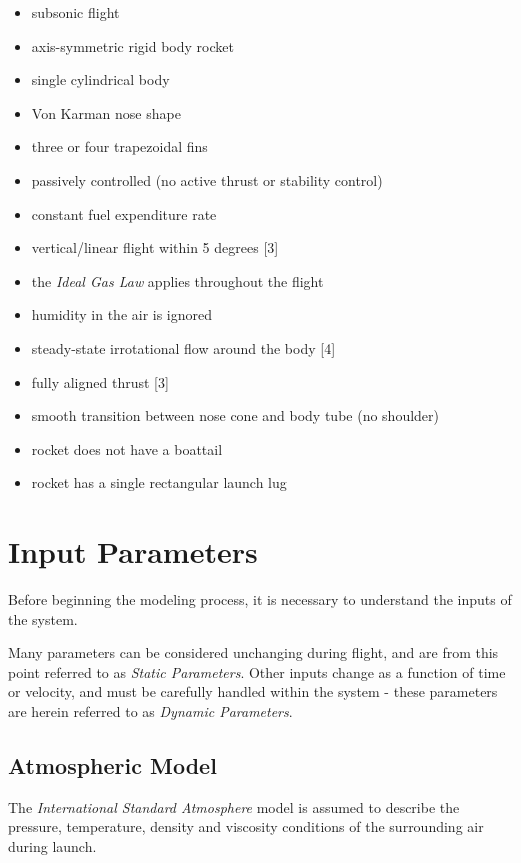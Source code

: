 \documentclass[]{book}
\providecommand{\tightlist}{%
  \setlength{\itemsep}{0pt}\setlength{\parskip}{0pt}}
\begin{document}
\begin{itemize}
\tightlist
\item
  subsonic flight
\item
  axis-symmetric rigid body rocket
\item
  single cylindrical body
\item
  Von Karman nose shape
\item
  three or four trapezoidal fins
\item
  passively controlled (no active thrust or stability control)
\item
  constant fuel expenditure rate
\item
  vertical/linear flight within 5 degrees {[}3{]}
\item
  the \emph{Ideal Gas Law} applies throughout the flight
\item
  humidity in the air is ignored
\item
  steady-state irrotational flow around the body {[}4{]}
\item
  fully aligned thrust {[}3{]}
\item
  smooth transition between nose cone and body tube (no shoulder)
\item
  rocket does not have a boattail
\item
  rocket has a single rectangular launch lug
\end{itemize}

\chapter{Input Parameters}\label{input-parameters}

Before beginning the modeling process, it is necessary to understand the
inputs of the system.

Many parameters can be considered unchanging during flight, and are from
this point referred to as \emph{Static Parameters}. Other inputs change
as a function of time or velocity, and must be carefully handled within
the system - these parameters are herein referred to as \emph{Dynamic
Parameters}.

\section{Atmospheric Model}\label{atmospheric-model}

The \emph{International Standard Atmosphere} model is assumed to
describe the pressure, temperature, density and viscosity conditions of
the surrounding air during launch.
\end{document}
